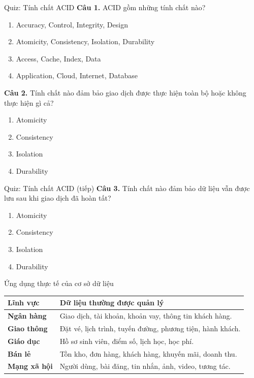 ﻿\documentclass[aspectratio=169,11pt]{beamer}
\newcommand{\tightlist}{\setlength{\itemsep}{2pt}\setlength{\parskip}{0pt}}
\newcommand{\qoption}[2]{\item[#1.] #2}
\begin{document}
\begin{frame}{Quiz: Tính chất ACID}
\small
\textbf{Câu 1.} ACID gồm những tính chất nào?
\begin{enumerate}
\tightlist
  \qoption{A}{Accuracy, Control, Integrity, Design}
  \qoption{B}{Atomicity, Consistency, Isolation, Durability}
  \qoption{C}{Access, Cache, Index, Data}
  \qoption{D}{Application, Cloud, Internet, Database}
\end{enumerate}

\textbf{Câu 2.} Tính chất nào đảm bảo giao dịch được thực hiện toàn bộ hoặc không thực hiện gì cả?
\begin{enumerate}
\tightlist
  \qoption{A}{Atomicity}
  \qoption{B}{Consistency}
  \qoption{C}{Isolation}
  \qoption{D}{Durability}
\end{enumerate}
\end{frame}

\begin{frame}{Quiz: Tính chất ACID (tiếp)}
\small
\textbf{Câu 3.} Tính chất nào đảm bảo dữ liệu vẫn được lưu sau khi giao dịch đã hoàn tất?
\begin{enumerate}
\tightlist
  \qoption{A}{Atomicity}
  \qoption{B}{Consistency}
  \qoption{C}{Isolation}
  \qoption{D}{Durability}
\end{enumerate}
\end{frame}

\begin{frame}{Ứng dụng thực tế của cơ sở dữ liệu}
\small
\begin{tabularx}{\textwidth}{>{\bfseries}p{} X}
\toprule
Lĩnh vực & Dữ liệu thường được quản lý \\
\midrule
Ngân hàng & Giao dịch, tài khoản, khoản vay, thông tin khách hàng. \\
Giao thông & Đặt vé, lịch trình, tuyến đường, phương tiện, hành khách. \\
Giáo dục & Hồ sơ sinh viên, điểm số, lịch học, học phí. \\
Bán lẻ & Tồn kho, đơn hàng, khách hàng, khuyến mãi, doanh thu. \\
Mạng xã hội & Người dùng, bài đăng, tin nhắn, ảnh, video, tương tác. \\
\bottomrule
\end{tabularx}
\end{frame}
\end{document}
